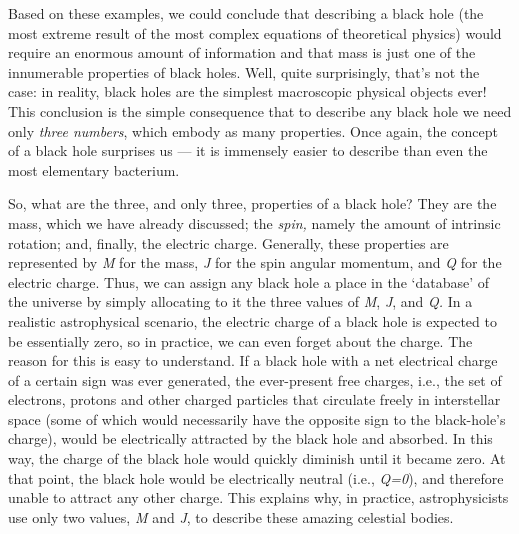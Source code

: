 Based on these examples, we could conclude that describing a black hole (the most
extreme result of the most complex equations of theoretical physics) would require an
enormous amount of information and that mass is just one of the innumerable properties
of black holes. Well, quite surprisingly, that's not the case: in reality, black holes
are the simplest macroscopic physical objects ever! This conclusion is the simple
consequence that to describe any black hole we need only \emph{three numbers}, which
embody as many properties. Once again, the concept of a black hole surprises us --- it
is immensely easier to describe than even the most elementary bacterium.

So, what are the three, and only three, properties of a black hole? They are the
mass, which we have already discussed; the
\emph{spin}\emph{,} namely the amount of intrinsic rotation; and,
finally, the electric charge. Generally, these properties are
represented by \emph{M} for the mass, \emph{J} for the spin angular momentum, and
\emph{Q} for the electric charge. Thus, we can assign any black hole a
place in the `database' of the universe by simply allocating to it the three values of
\emph{M}, \emph{J}, and \emph{Q.} In a realistic astrophysical scenario, the electric
charge of a black hole is expected to be essentially zero, so in practice, we can even
forget about the charge. The reason for this is easy to understand. If a black hole with
a net electrical charge of a certain sign was ever generated, the ever-present free
charges, i.e., the set of electrons, protons and other charged particles that circulate
freely in interstellar space (some of which would necessarily have the opposite sign to
the black-hole's charge), would be electrically attracted by the black hole and
absorbed. In this way, the charge of the black hole would quickly diminish until it
became zero. At that point, the black hole would be electrically neutral (i.e.,
\emph{Q=0}), and therefore unable to attract any other charge. This explains why, in
practice, astrophysicists use only two values, \emph{M} and \emph{J}, to describe these
amazing celestial bodies.

